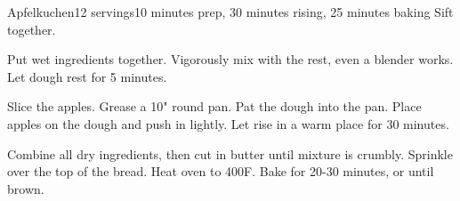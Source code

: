 \documentclass[../Cookbook.tex]{subfiles}
\begin{document}
\begin{recipe}[Apfelkuchen]{Apfelkuchen}{12 servings}{10 minutes prep, 30 minutes rising, 25 minutes baking}
	Sift together.

	Put wet ingredients together.
	Vigorously mix with the rest, even a blender works.
	Let dough rest for 5 minutes.

	Slice the apples.
	Grease a 10" round pan.
	Pat the dough into the pan.
	Place apples on the dough and push in lightly.
	Let rise in a warm place for 30 minutes.

	Combine all dry ingredients, then cut in butter until mixture is crumbly.
	Sprinkle over the top of the bread.
	Heat oven to 400\0F.
	Bake for 20-30 minutes, or until brown.
\end{recipe}
\end{document}
